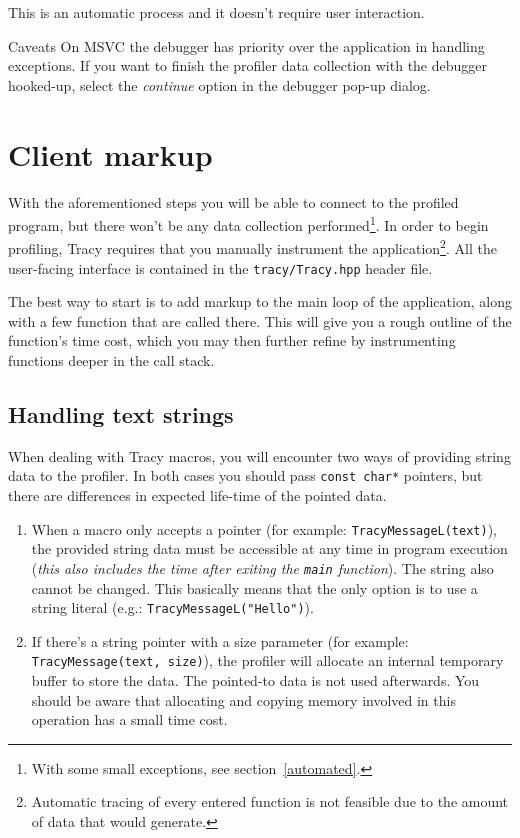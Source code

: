 \documentclass[hidelinks,titlepage,a4paper]{article}
\begin{document}
This is an automatic process and it doesn't require user interaction.

\begin{bclogo}[
noborder=true,
couleur=black!5,
logo=\bcattention
]{Caveats}
On MSVC the debugger has priority over the application in handling exceptions. If you want to finish the profiler data collection with the debugger hooked-up, select the \emph{continue} option in the debugger pop-up dialog.
\end{bclogo}

\section{Client markup}
\label{client}

With the aforementioned steps you will be able to connect to the profiled program, but there won't be any data collection performed\footnote{With some small exceptions, see section~\ref{automated}.}. In order to begin profiling, Tracy requires that you manually instrument the application\footnote{Automatic tracing of every entered function is not feasible due to the amount of data that would generate.}. All the user-facing interface is contained in the \texttt{tracy/Tracy.hpp} header file.

The best way to start is to add markup to the main loop of the application, along with a few function that are called there. This will give you a rough outline of the function's time cost, which you may then further refine by instrumenting functions deeper in the call stack.

\subsection{Handling text strings}

When dealing with Tracy macros, you will encounter two ways of providing string data to the profiler. In both cases you should pass \texttt{const char*} pointers, but there are differences in expected life-time of the pointed data.

\begin{enumerate}
\item When a macro only accepts a pointer (for example: \texttt{TracyMessageL(text)}), the provided string data must be accessible at any time in program execution (\emph{this also includes the time after exiting the \texttt{main} function}). The string also cannot be changed. This basically means that the only option is to use a string literal (e.g.: \texttt{TracyMessageL("Hello")}).

\item If there's a string pointer with a size parameter (for example: \texttt{TracyMessage(text, size)}), the profiler will allocate an internal temporary buffer to store the data. The pointed-to data is not used afterwards. You should be aware that allocating and copying memory involved in this operation has a small time cost.
\end{enumerate}
\end{document}
